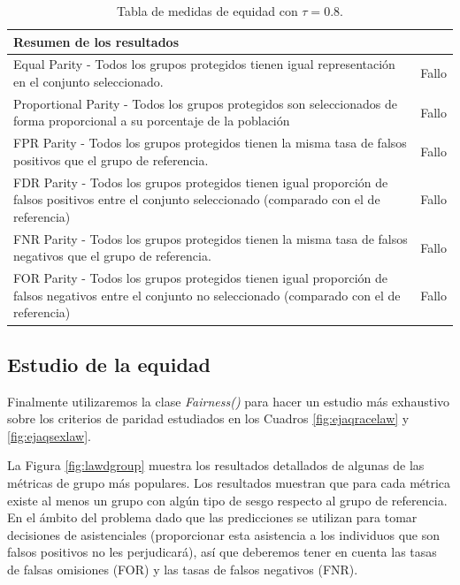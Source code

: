 \begin{table}[h]
\centering
\resizebox{17.cm}{!} {
\begin{tabular}{ll}
\textbf{Resumen de los resultados}                                                                                                                              &                              \\ \hline
Equal Parity - Todos los grupos protegidos tienen igual representación en el conjunto seleccionado.                                                     & {\color[HTML]{FE0000} Fallo} \\
Proportional Parity - Todos los grupos protegidos son seleccionados de forma proporcional a su porcentaje de la población                               & {\color[HTML]{FE0000} Fallo} \\
FPR Parity - Todos los grupos protegidos tienen la misma tasa de falsos positivos que el grupo de referencia.                                           & {\color[HTML]{FE0000} Fallo} \\
FDR Parity - Todos los grupos protegidos tienen igual proporción de falsos positivos entre el conjunto seleccionado (comparado con el de referencia)    & {\color[HTML]{FE0000} Fallo} \\
FNR Parity - Todos los grupos protegidos tienen la misma tasa de falsos negativos que el grupo de referencia.                                           & {\color[HTML]{FE0000} Fallo} \\
FOR Parity - Todos los grupos protegidos tienen igual proporción de falsos negativos entre el conjunto no seleccionado (comparado con el de referencia) & {\color[HTML]{FE0000} Fallo}
\end{tabular}
}
	\caption{Tabla de medidas de equidad con $\tau=0.8$.}
    \label{fig:medequmbral2}
\end{table}

\subsection*{Estudio de la equidad}

Finalmente utilizaremos la clase \textit{Fairness()} para hacer un estudio más exhaustivo sobre los criterios de paridad estudiados en los Cuadros \ref{fig:ejaqracelaw} y \ref{fig:ejaqsexlaw}.

La Figura \ref{fig:lawdgroup} muestra los resultados detallados de algunas de las métricas de grupo más populares. Los resultados muestran que para cada métrica existe al menos un grupo con algún tipo de sesgo respecto al grupo de referencia. En el ámbito del problema dado que las predicciones se utilizan para tomar decisiones de asistenciales (proporcionar esta asistencia a los individuos que son falsos positivos no les perjudicará), así que deberemos tener en cuenta las tasas de falsas omisiones (FOR) y las tasas de falsos negativos (FNR).\\


